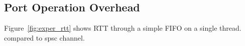 \subsection{Port Operation Overhead}
Figure~\ref{fig:exper_rtt} shows RTT through a simple FIFO on a single thread. compared to spsc channel.
\begin{figure}
	\centering
\end{figure}
